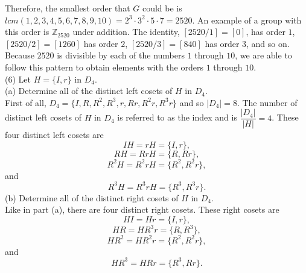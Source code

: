 \documentclass[11pt,a4paper]{article}
\begin{document}
Therefore, the smallest order that $G$ could be is $lcm(1,2,3,4,5,6,7,8,9,10) = 2^3\cdot 3^2\cdot 5 \cdot 7 = 2520$. An example of a group with this order is $\mathbb{Z}_{2520}$ under addition. The identity, $[2520/1] = [0]$, has order $1$, $[2520/2] = [1260]$ has order $2$,  $[2520/3] = [840]$ has order $3$, and so on. Because $2520$ is divisible by each of the numbers $1$ through $10$, we are able to follow this pattern to obtain elements with the orders $1$ through $10$.
~\\
(6) Let $H = \{I, r\}$ in $D_4$.\\
(a) Determine all of the distinct left cosets of $H$ in $D_4$.\\
First of all, $D_4 = \{I, R, R^2, R^3, r, Rr, R^2r, R^3r\}$ and so $|D_4| = 8$. The number of distinct left cosets of $H$ in $D_4$ is referred to as the index and is $\dfrac{|D_4|}{|H|} = 4$. These four distinct left cosets are
\[IH = rH = \{I, r\},\] 
\[RH = RrH = \{R, Rr\},\]
\[R^2H = R^2rH = \{R^2, R^2r\},\]
and
\[R^3H = R^3rH = \{R^3, R^3r\}.\]
(b) Determine all of the distinct right cosets of $H$ in $D_4$.\\
Like in part (a), there are four distinct right cosets. These right cosets are
\[HI = Hr = \{I,r\},\]
\[HR = HR^3r = \{R,R^3\},\]
\[HR^2 = HR^2r = \{R^2, R^2r\},\]
and
\[HR^3 = HRr = \{R^3,Rr\}.\]
\end{document}
